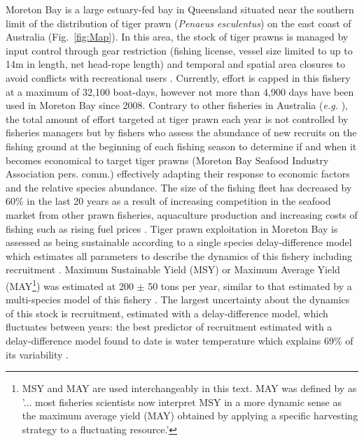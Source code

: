 Moreton Bay is a large estuary-fed bay in Queensland situated near the southern limit of the distribution of tiger prawn ({\it Penaeus esculentus}) on the east coast of Australia (Fig.~\ref{fig:Map}). In this area, the stock of tiger prawns is managed by input control through gear restriction (fishing license, vessel size limited to up to 14m in length, net head-rope length) and temporal and spatial area closures to avoid conflicts with recreational users \citep{Pascoe2017121}. Currently, effort is capped in this fishery at a maximum of 32,100 boat-days, however not more than 4,900 days have been used in Moreton Bay since 2008. Contrary to other fisheries in Australia ({\it e.g.} \cite{Dichmont05012010}), the total amount of effort targeted at tiger prawn each year is not controlled by fisheries managers but by fishers who assess the abundance of new recruits on the fishing ground at the beginning of each fishing season to determine if and when it becomes economical to target tiger prawns (Moreton Bay Seafood Industry Association pers. comm.) effectively adapting their response to economic factors and the relative species abundance. The size of the fishing fleet has decreased by 60\% in the last 20 years as a result of increasing competition in the seafood market from other prawn fisheries, aquaculture production and increasing costs of fishing such as rising fuel prices \citep{Pascoe2017121, FAO2016}. Tiger prawn exploitation in Moreton Bay is assessed as being sustainable according to a single species delay-difference model which estimates all parameters to describe the dynamics of this fishery including recruitment \citep{KienzleEtAl2015, Kienzle2014138}. Maximum Sustainable Yield (MSY) or Maximum Average Yield (MAY\footnote{MSY and MAY are used interchangeably in this text. MAY was defined by \cite{Mace2000MSYa} as '... most fisheries scientists now interpret MSY in a more dynamic sense as the maximum average yield (MAY) obtained by applying a specific harvesting strategy to a fluctuating resource.'}) was estimated at 200 $\pm$ 50 tons per year, similar to that estimated by a multi-species model of this fishery \citep{NaWang2015a}. The largest uncertainty about the dynamics of this stock is recruitment, estimated with a delay-difference model, which fluctuates between years: the best predictor of recruitment estimated with a delay-difference model \citep{KienzleEtAl2015} found to date is water temperature which explains 69\% of its variability \citep{KienzleEtAl2017}. \\

